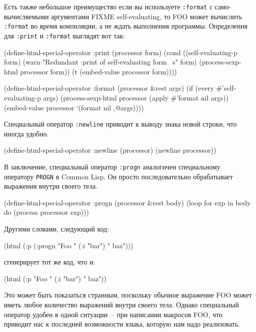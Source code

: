 Есть также небольшое преимущество если вы используете \lstinline{:format} с само-вычисляемыми
аргументами FIXME self-evaluating, то FOO может вычислить \lstinline{:format} во время
компиляции, а не ждать выполнения программы.  Определения для \lstinline{:print} и
\lstinline{:format} выглядят вот так:

\begin{myverb}
(define-html-special-operator :print (processor form)
  (cond
    ((self-evaluating-p form)
     (warn "Redundant :print of self-evaluating form ~s" form)
     (process-sexp-html processor form))
    (t
     (embed-value processor form))))

(define-html-special-operator :format (processor &rest args)
  (if (every #'self-evaluating-p args)
    (process-sexp-html processor (apply #'format nil args))
    (embed-value processor `(format nil ,@args))))
\end{myverb}

Специальный оператор \lstinline{:newline} приводит к выводу знака новой строки, что иногда удобно.

\begin{myverb}
(define-html-special-operator :newline (processor)
  (newline processor))
\end{myverb}

В заключение, специальный оператор \lstinline{:progn} аналогичен специальному оператору
\lstinline{PROGN} в Common Lisp.  Он просто последовательно обрабатывает выражения внутри
своего тела.

\begin{myverb}
(define-html-special-operator :progn (processor &rest body)
  (loop for exp in body do (process processor exp)))
\end{myverb}

Другими словами, следующий код:

\begin{myverb}
(html (:p (:progn "Foo " (:i "bar") " baz")))
\end{myverb}

сгенерирует тот же код, что и:

\begin{myverb}
(html (:p "Foo " (:i "bar") " baz"))
\end{myverb}

Это может быть показаться странным, поскольку обычное выражение FOO может иметь любое
количество выражений внутри своего тела.  Однако специальный оператор удобен в одной
ситуации~-- при написании макросов FOO, что приводит нас к последней возможности языка,
которую нам надо реализовать.

